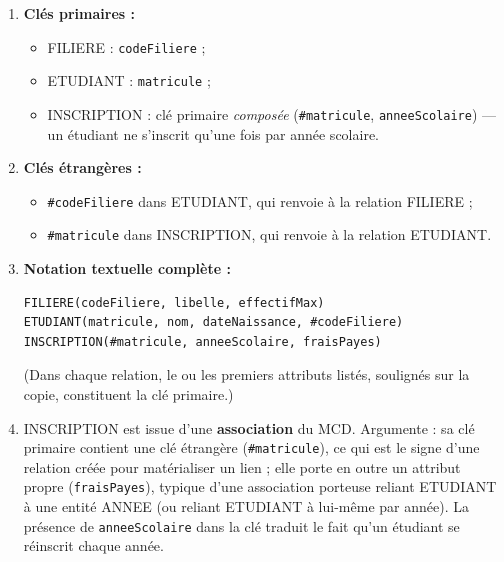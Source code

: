 \documentclass[11pt]{article}
\begin{document}
\begin{corrige}
\begin{enumerate}
  \item \textbf{Clés primaires :}
  \begin{itemize}
    \item FILIERE : \texttt{codeFiliere} ;
    \item ETUDIANT : \texttt{matricule} ;
    \item INSCRIPTION : clé primaire \emph{composée} (\texttt{\#matricule}, \texttt{anneeScolaire}) — un étudiant ne s'inscrit qu'une fois par année scolaire.
  \end{itemize}
  \item \textbf{Clés étrangères :}
  \begin{itemize}
    \item \texttt{\#codeFiliere} dans ETUDIANT, qui renvoie à la relation FILIERE ;
    \item \texttt{\#matricule} dans INSCRIPTION, qui renvoie à la relation ETUDIANT.
  \end{itemize}
  \item \textbf{Notation textuelle complète :}
\begin{lstlisting}
FILIERE(codeFiliere, libelle, effectifMax)
ETUDIANT(matricule, nom, dateNaissance, #codeFiliere)
INSCRIPTION(#matricule, anneeScolaire, fraisPayes)
\end{lstlisting}
  (Dans chaque relation, le ou les premiers attributs listés, soulignés sur la copie, constituent la clé primaire.)
  \item INSCRIPTION est issue d'une \textbf{association} du MCD. Argumente : sa clé primaire contient une clé étrangère (\texttt{\#matricule}), ce qui est le signe d'une relation créée pour matérialiser un lien ; elle porte en outre un attribut propre (\texttt{fraisPayes}), typique d'une association porteuse reliant ETUDIANT à une entité ANNEE (ou reliant ETUDIANT à lui-même par année). La présence de \texttt{anneeScolaire} dans la clé traduit le fait qu'un étudiant se réinscrit chaque année.
\end{enumerate}
\end{corrige}
\end{document}
